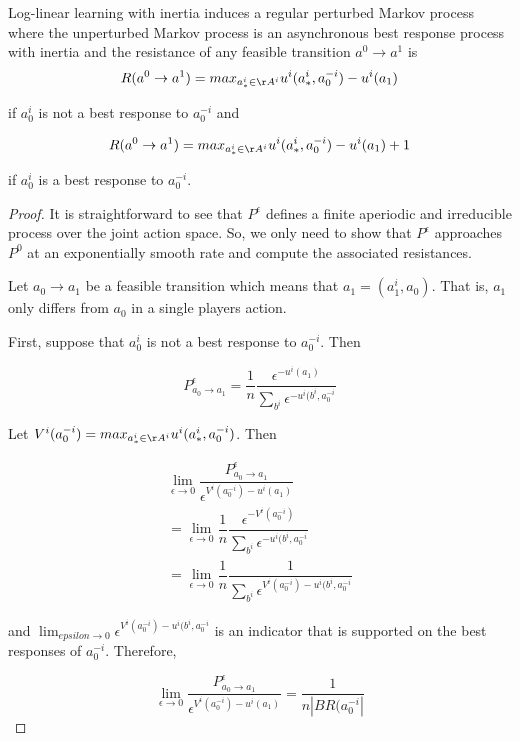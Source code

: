 \begin{lem}
Log-linear learning with inertia induces a regular perturbed Markov process where the unperturbed Markov process is an asynchronous best response process with inertia and the resistance of any feasible transition $a^0 \rightarrow a^1$ is 
$$
R(a^0 \rightarrow a^1) = max_{a^i_* \in \AA^i} u^i(a^i_*, a^{-i}_0) - u^i(a_1)
$$

if $a^i_0$ is not a best response to $a^{-i}_0$ and

$$
R(a^0 \rightarrow a^1) = max_{a^i_* \in \AA^i} u^i(a^i_*, a^{-i}_0) - u^i(a_1) + 1
$$

if $a^i_0$ is a best response to $a^{-i}_0$.

\end{lem}
\begin{proof}
It is straightforward to see that $P^{\epsilon}$ defines a finite aperiodic and irreducible process over the joint action space. So, we only need to show that $P^{\epsilon}$ approaches $P^0$ at an exponentially smooth rate and compute the associated resistances.

Let $a_0 \rightarrow a_1$ be a feasible transition which means that $a_1 = (a^i_1, a_0)$. That is, $a_1$ only differs from $a_0$ in a single players action.

First, suppose that $a^i_0$ is not a best response to $a^{-i}_0$. Then

$$
P^{\epsilon}_{a_0 \rightarrow a_1} = \dfrac{1}{n} \dfrac{\epsilon^{-u^i(a_1)}}{\sum_{b^i} \epsilon^{-u^i(b^i, a^{-i}_0}}
$$

Let $V^i(a_0^{-i}) = max_{a^i_* \in \AA^i} u^i(a^i_*, a^{-i}_0)$. Then

\begin{align*}
\lim_{\epsilon \rightarrow 0} \dfrac{P^{\epsilon}_{a_0 \rightarrow a_1}}{\epsilon^{V^i(a_0^{-i}) - u^i(a_1)}} \\
= \lim_{\epsilon \rightarrow 0} \dfrac{1}{n} \dfrac{\epsilon^{-V^i(a_0^{-i})}}{\sum_{b^i} \epsilon^{-u^i(b^i, a^{-i}_0}} \\
= \lim_{\epsilon \rightarrow 0} \dfrac{1}{n} \dfrac{1}{\sum_{b^i} \epsilon^{V^i(a_0^{-i})-u^i(b^i, a^{-i}_0}}
\end{align*}

and $\lim_{epsilon \rightarrow 0} \epsilon^{V^i(a_0^{-i})-u^i(b^i, a^{-i}_0}$ is an indicator that is supported on the best responses of $a^{-i}_0$. Therefore,

$$
\lim_{\epsilon \rightarrow 0} \dfrac{P^{\epsilon}_{a_0 \rightarrow a_1}}{\epsilon^{V^i(a_0^{-i}) - u^i(a_1)}} = \dfrac{1}{n |BR(a^{-i}_0|}
$$


\end{proof}
